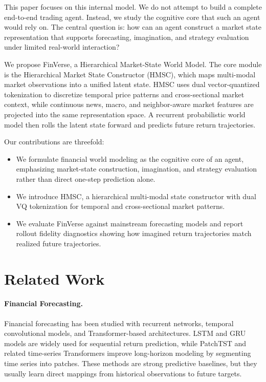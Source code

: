 \documentclass[letterpaper]{article}
\begin{document}
This paper focuses on this internal model. We do not attempt to build a complete end-to-end trading agent. Instead, we study the cognitive core that such an agent would rely on. The central question is: how can an agent construct a market state representation that supports forecasting, imagination, and strategy evaluation under limited real-world interaction?

We propose FinVerse, a Hierarchical Market-State World Model. The core module is the Hierarchical Market State Constructor (HMSC), which maps multi-modal market observations into a unified latent state. HMSC uses dual vector-quantized tokenization to discretize temporal price patterns and cross-sectional market context, while continuous news, macro, and neighbor-aware market features are projected into the same representation space. A recurrent probabilistic world model then rolls the latent state forward and predicts future return trajectories.

Our contributions are threefold:
\begin{itemize}
    \item We formulate financial world modeling as the cognitive core of an agent, emphasizing market-state construction, imagination, and strategy evaluation rather than direct one-step prediction alone.
    \item We introduce HMSC, a hierarchical multi-modal state constructor with dual VQ tokenization for temporal and cross-sectional market patterns.
    \item We evaluate FinVerse against mainstream forecasting models and report rollout fidelity diagnostics showing how imagined return trajectories match realized future trajectories.
\end{itemize}

\section{Related Work}
\paragraph{Financial Forecasting.}
Financial forecasting has been studied with recurrent networks, temporal convolutional models, and Transformer-based architectures. LSTM and GRU models are widely used for sequential return prediction, while PatchTST and related time-series Transformers improve long-horizon modeling by segmenting time series into patches. These methods are strong predictive baselines, but they usually learn direct mappings from historical observations to future targets.
\end{document}
